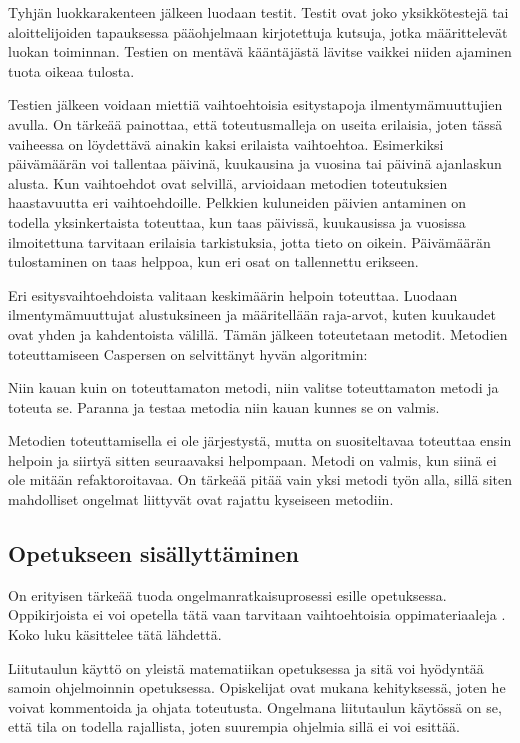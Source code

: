 Tyhjän luokkarakenteen jälkeen luodaan testit. Testit ovat joko yksikkötestejä
tai aloittelijoiden tapauksessa pääohjelmaan kirjotettuja kutsuja, jotka
määrittelevät luokan toiminnan. Testien on mentävä kääntäjästä lävitse vaikkei
niiden ajaminen tuota oikeaa tulosta.

Testien jälkeen voidaan miettiä vaihtoehtoisia esitystapoja ilmentymämuuttujien
avulla. On tärkeää painottaa, että toteutusmalleja on useita erilaisia, joten
tässä vaiheessa on löydettävä ainakin kaksi erilaista vaihtoehtoa. Esimerkiksi
päivämäärän voi tallentaa päivinä, kuukausina ja vuosina tai päivinä ajanlaskun
alusta. Kun vaihtoehdot ovat selvillä, arvioidaan metodien toteutuksien
haastavuutta eri vaihtoehdoille. Pelkkien kuluneiden päivien antaminen on
todella yksinkertaista toteuttaa, kun taas päivissä, kuukausissa ja vuosissa
ilmoitettuna tarvitaan erilaisia tarkistuksia, jotta tieto on oikein.
Päivämäärän tulostaminen on taas helppoa, kun eri osat on tallennettu erikseen.

Eri esitysvaihtoehdoista valitaan keskimäärin helpoin toteuttaa. Luodaan
ilmentymämuuttujat alustuksineen ja määritellään raja-arvot, kuten kuukaudet
ovat yhden ja kahdentoista välillä. Tämän jälkeen toteutetaan metodit. Metodien
toteuttamiseen Caspersen on selvittänyt hyvän algoritmin:

Niin kauan kuin on toteuttamaton metodi, niin valitse toteuttamaton metodi ja
toteuta se. Paranna ja testaa metodia niin kauan kunnes se on valmis.

Metodien toteuttamisella ei ole järjestystä, mutta on suositeltavaa toteuttaa
ensin helpoin ja siirtyä sitten seuraavaksi helpompaan. Metodi on valmis, kun
siinä ei ole mitään refaktoroitavaa. On tärkeää pitää vain yksi metodi työn
alla, sillä siten mahdolliset ongelmat liittyvät ovat rajattu kyseiseen
metodiin.

\subsection{Opetukseen sisällyttäminen}

On erityisen tärkeää tuoda ongelmanratkaisuprosessi esille opetuksessa.
Oppikirjoista ei voi opetella tätä vaan tarvitaan vaihtoehtoisia
oppimateriaaleja \cite{Bennedsen:2008}. Koko luku käsittelee tätä lähdettä.

Liitutaulun käyttö on yleistä matematiikan opetuksessa ja sitä voi hyödyntää
samoin ohjelmoinnin opetuksessa. Opiskelijat ovat mukana kehityksessä, joten he
voivat kommentoida ja ohjata toteutusta. Ongelmana liitutaulun käytössä on se,
että tila on todella rajallista, joten suurempia ohjelmia sillä ei voi esittää.

